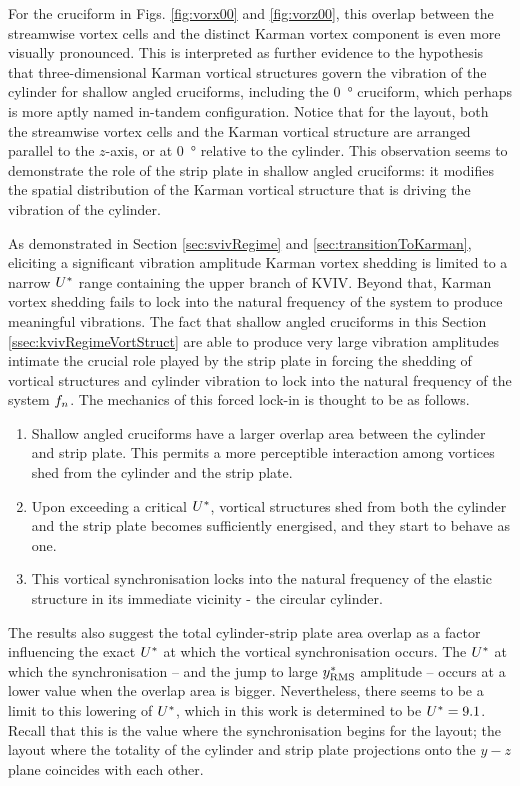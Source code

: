 \documentclass[oneside]{utmthesis}
\begin{document}
For the \angon{} cruciform in Figs. \ref{fig:vorx00} and \ref{fig:vorz00}, this overlap between the streamwise vortex cells and the distinct Karman vortex component is even more visually pronounced. This is interpreted as further evidence to the hypothesis that three-dimensional Karman vortical structures govern the vibration of the cylinder for shallow angled cruciforms, including the \SI{0}{\degree} cruciform, which perhaps is more aptly named in-tandem configuration. Notice that for the \angon{} layout, both the streamwise vortex cells and the Karman vortical structure are arranged parallel to the $z$-axis, or at \SI{0}{\degree} relative to the cylinder. This observation seems to demonstrate the role of the strip plate in shallow angled cruciforms: it modifies the spatial distribution of the Karman vortical structure that is driving the vibration of the cylinder.

As demonstrated in Section \ref{sec:svivRegime} and \ref{sec:transitionToKarman}, eliciting a significant vibration amplitude Karman vortex shedding is limited to a narrow $U^{*}$ range containing the upper branch of KVIV. Beyond that, Karman vortex shedding fails to lock into the natural frequency of the system to produce meaningful vibrations. The fact that shallow angled cruciforms in this Section \ref{ssec:kvivRegimeVortStruct} are able to produce very large vibration amplitudes intimate the crucial role played by the strip plate in forcing the shedding of vortical structures and cylinder vibration to lock into the natural frequency of the system $f_{n}$. The mechanics of this forced lock-in is thought to be as follows.

\begin{enumerate}
  \item Shallow angled cruciforms have a larger overlap area between the cylinder and strip plate. This permits a more perceptible interaction among vortices shed from the cylinder and the strip plate.
  \item Upon exceeding a critical $U^{*}$, vortical structures shed from both the cylinder and the strip plate becomes sufficiently energised, and they start to behave as one.
  \item This vortical synchronisation locks into the natural frequency of the elastic structure in its immediate vicinity - the circular cylinder.
\end{enumerate}

\noindent The results also suggest the total cylinder-strip plate area overlap as a factor influencing the exact $U^{*}$ at which the vortical synchronisation occurs. The $U^{*}$ at which the synchronisation -- and the jump to large $y^{*}_{\text{RMS}}$ amplitude -- occurs at a lower value when the overlap area is bigger. Nevertheless, there seems to be a limit to this lowering of $U^{*}$, which in this work is determined to be $U^{*} = 9.1$. Recall that this is the value where the synchronisation begins for the \angon{} layout; the layout where the totality of the cylinder and strip plate projections onto the $y-z$ plane coincides with each other.
\end{document}
